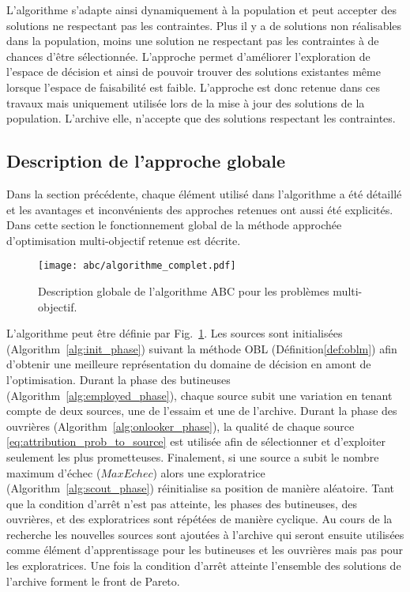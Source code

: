 L’algorithme s’adapte ainsi dynamiquement à la population et peut accepter des
solutions ne respectant pas les contraintes. Plus il y a de solutions non
réalisables dans la population, moins une solution ne respectant pas les contraintes à
de chances d’être sélectionnée. L’approche permet d’améliorer l’exploration de
l’espace de décision et ainsi de pouvoir trouver des solutions existantes même
lorsque l’espace de faisabilité est faible.
L’approche est donc retenue dans ces travaux mais uniquement utilisée lors de la mise à jour
des solutions de la population. L’archive elle, n’accepte que des solutions respectant les
contraintes.


\subsection{Description de l’approche globale} %
\label{sub:description_de_l_approche_globale}

Dans la section précédente, chaque élément utilisé dans l’algorithme a été détaillé et
les avantages et inconvénients des approches retenues ont aussi été explicités.
Dans cette section le fonctionnement global de la méthode approchée d’optimisation
multi-objectif retenue est décrite.

\begin{figure}
    \begin{center}
        \texttt{[image: abc/algorithme\_complet.pdf]}
    \end{center}
    \caption{Description globale de l’algorithme ABC pour les problèmes multi-objectif.
             \label{fig:abc_complet}}
\end{figure}

L’algorithme peut être définie par Fig.~\ref{fig:abc_complet}.
Les sources sont initialisées (Algorithm~\ref{alg:init_phase}) suivant la méthode
OBL (Définition\ref{def:oblm}) afin d’obtenir une meilleure représentation du
domaine de décision en amont de l’optimisation.
Durant la phase des butineuses (Algorithm~\ref{alg:employed_phase}), chaque source
subit une variation en tenant compte de deux sources, une de l’essaim et une de l’archive.
Durant la phase des ouvrières (Algorithm~\ref{alg:onlooker_phase}), la qualité de
chaque source \eqref{eq:attribution_prob_to_source} est utilisée afin de sélectionner
et d’exploiter seulement les plus prometteuses. Finalement, si une source a subit le
nombre maximum d’échec ($MaxEchec$) alors une exploratrice (Algorithm~\ref{alg:scout_phase})
réinitialise sa position de manière aléatoire.
Tant que la condition d’arrêt n’est pas atteinte, les phases des butineuses,
des ouvrières, et des exploratrices sont répétées de manière cyclique. Au cours de
la recherche les nouvelles sources sont ajoutées à l’archive qui seront ensuite utilisées
comme élément d’apprentissage pour les butineuses et les ouvrières mais pas pour les
exploratrices. Une fois la condition d’arrêt atteinte l’ensemble des solutions
de l’archive forment le front de Pareto.

